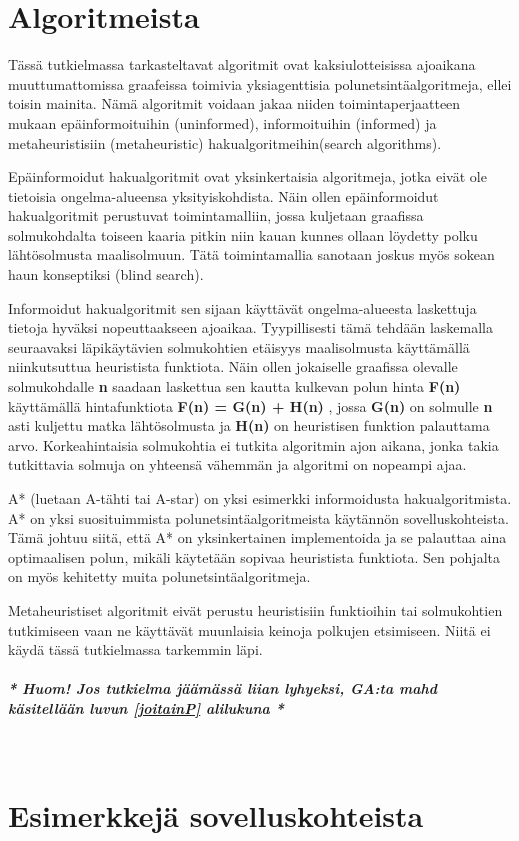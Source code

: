 \section{Algoritmeista}\label{algoritmeista}
Tässä tutkielmassa tarkasteltavat algoritmit ovat kaksiulotteisissa 
ajoaikana muuttumattomissa graafeissa toimivia yksiagenttisia 
polunetsintäalgoritmeja, ellei toisin mainita. Nämä algoritmit voidaan jakaa 
niiden toimintaperjaatteen mukaan epäinformoituihin (uninformed), 
informoituihin (informed) ja metaheuristisiin (metaheuristic) 
hakualgoritmeihin(search algorithms).\cite{applSciLawande}\par
	Epäinformoidut hakualgoritmit ovat yksinkertaisia algoritmeja, jotka 
eivät ole tietoisia ongelma-alueensa yksityiskohdista. Näin ollen 
epäinformoidut hakualgoritmit perustuvat toimintamalliin, jossa kuljetaan 
graafissa solmukohdalta toiseen kaaria pitkin niin kauan kunnes ollaan 
löydetty polku lähtösolmusta maalisolmuun. Tätä toimintamallia sanotaan 
joskus myös sokean haun konseptiksi (blind search).\cite{applSciLawande}\par
	Informoidut hakualgoritmit sen sijaan käyttävät ongelma-alueesta 
laskettuja tietoja hyväksi nopeuttaakseen ajoaikaa. Tyypillisesti tämä 
tehdään laskemalla seuraavaksi läpikäytävien solmukohtien etäisyys 
maalisolmusta käyttämällä niinkutsuttua heuristista funktiota. Näin ollen 
jokaiselle graafissa olevalle solmukohdalle \textbf{n} saadaan laskettua sen 
kautta kulkevan polun hinta \textbf{F(n)} käyttämällä hintafunktiota 
\textbf{F(n) = G(n) + H(n)} , jossa \textbf{G(n)} on solmulle \textbf{n} 
asti kuljettu matka lähtösolmusta ja \textbf{H(n)} on heuristisen funktion 
palauttama arvo. Korkeahintaisia solmukohtia ei tutkita algoritmin ajon 
aikana, jonka takia tutkittavia solmuja on yhteensä vähemmän ja algoritmi on 
nopeampi ajaa.\cite{applSciLawande}\par
	A* (luetaan A-tähti tai A-star) on yksi esimerkki informoidusta 
hakualgoritmista. A* on yksi suosituimmista polunetsintäalgoritmeista 
käytännön sovelluskohteista. Tämä johtuu siitä, että A* on yksinkertainen 
implementoida ja se palauttaa aina optimaalisen polun, mikäli käytetään 
sopivaa heuristista funktiota.\cite{MathewAndMalathy} Sen pohjalta on 
myös kehitetty muita polunetsintäalgoritmeja.\cite{applSciLawande}\par
	Metaheuristiset algoritmit eivät perustu heuristisiin funktioihin tai 
solmukohtien tutkimiseen vaan ne käyttävät muunlaisia keinoja polkujen 
etsimiseen.\cite{applSciLawande} Niitä ei käydä tässä tutkielmassa tarkemmin 
läpi.
\\
\paragraph{\textit{* Huom! Jos tutkielma jäämässä liian lyhyeksi, GA:ta mahd käsitellään luvun \ref{joitainP} alilukuna *}}\mbox{}
\\

\section{Esimerkkejä sovelluskohteista}\label{eSuovelluskohteista}
